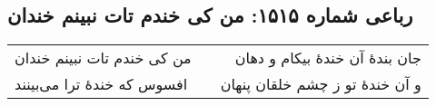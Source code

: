 \begin{center}
\section*{رباعی شماره ۱۵۱۵: من کی خندم تات نبینم خندان}
\label{sec:1515}
\begin{longtable}{l p{0.5cm} r}
من کی خندم تات نبینم خندان
&&
جان بندهٔ آن خندهٔ بیکام و دهان
\\
افسوس که خندهٔ ترا می‌بینند
&&
و آن خندهٔ تو ز چشم خلقان پنهان
\\
\end{longtable}
\end{center}
